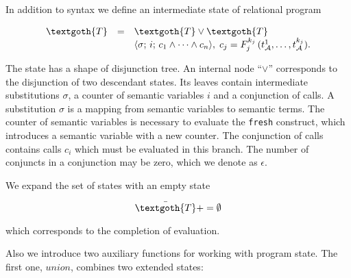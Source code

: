 
In addition to syntax we define an intermediate state of relational program

\[
\begin{array}{rcl}
  \textgoth{T} & = & \textgoth{T} \lor \textgoth{T}\\
               &   & \inbr{\sigma;\, i;\, c_1 \land \dots \land c_n},\; c_j = F_j^{k_j}\,(t_\mathcal{A}^1,\dots,t_\mathcal{A}^{k_j}).
\end{array}
\]

The state has a shape of disjunction tree. An internal node ``$\lor$'' corresponds to the disjunction of two descendant states.
Its leaves contain intermediate substitutions $\sigma$, a counter of semantic variables $i$ and a conjunction of calls. A substitution $\sigma$ is a
mapping from semantic variables to semantic terms. The counter of semantic variables is necessary to evaluate the \lstinline{fresh} construct,
which introduces a semantic variable with a new counter. The conjunction of calls contains calls $c_i$ which must be evaluated in this branch.
The number of conjuncts in a conjunction may be zero, which we denote as $\epsilon$.


We expand the set of states with an empty state

\[
\bar{\textgoth{T}} += \emptyset
\]

which corresponds to the completion of evaluation.

Also we introduce two auxiliary functions for working with program state. The first one,  $union$, combines two extended states:

